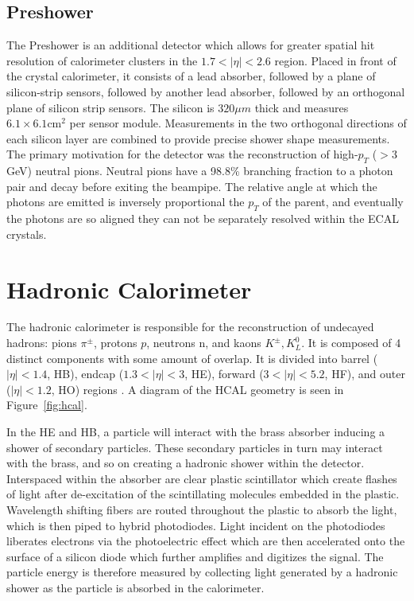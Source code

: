 \subsection{Preshower}

The Preshower is an additional detector which allows for greater spatial hit resolution of calorimeter clusters in the $1.7<|\eta|<2.6$ region. Placed in front of the crystal calorimeter, it consists of a lead absorber, followed by a plane of silicon-strip sensors, followed by another lead absorber, followed by an orthogonal plane of silicon strip sensors. The silicon is $320\mu m$ thick and measures $6.1\times6.1\textrm{cm}^{2}$ per sensor module. Measurements in the two orthogonal directions of each silicon layer are combined to provide precise shower shape measurements. The primary motivation for the detector was the reconstruction of high-$p_{T}$ ($>3\,$GeV) neutral pions. Neutral pions have a 98.8\% branching fraction to a photon pair and decay before exiting the beampipe. The relative angle at which the photons are emitted is inversely proportional the $p_{T}$ of the parent, and eventually the photons are so aligned they can not be separately resolved within the ECAL crystals.

\section{Hadronic Calorimeter}

The hadronic calorimeter is responsible for the reconstruction of undecayed hadrons: pions $\pi^{\pm}$, protons $p$, neutrons n, and kaons $K^{\pm}, K^{0}_{L}$. It is composed of 4 distinct components with some amount of overlap. It is divided into barrel ($|\eta|<1.4$, HB), endcap ($1.3<|\eta|<3$, HE), forward ($3<|\eta|<5.2$, HF), and outer ($|\eta|<1.2$, HO) regions  \cite{hcaltdr}. A diagram of the HCAL geometry is seen in Figure~\ref{fig:hcal}.

In the HE and HB, a particle will interact with the brass absorber inducing a shower of secondary particles. These secondary particles in turn may interact with the brass, and so on creating a hadronic shower within the detector. Interspaced within the absorber are clear plastic scintillator which create flashes of light after de-excitation of the scintillating molecules embedded in the plastic. Wavelength shifting fibers are routed throughout the plastic to absorb the light, which is then piped to hybrid photodiodes. Light incident on the photodiodes liberates electrons via the photoelectric effect which are then accelerated onto the surface of a silicon diode which further amplifies and digitizes the signal. The particle energy is therefore measured by collecting light generated by a hadronic shower as the particle is absorbed in the calorimeter.

